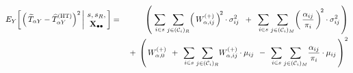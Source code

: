 \begin{lemma}
\begin{enumerate}
\begin{eqnarray*}
    E_{Y}\!\left[
        \left.
        \left(\,\widetilde{T}_{\alpha Y} - \widehat{T}^{\textnormal{(HT)}}_{\alpha Y}\right)^{2}
        \,\right\vert\!\!
        \begin{array}{c} s,s_{R}, \\ \Xobs \end{array}
        \!\!\right]
    & = &
        \left(\;
            \underset{i \in s}{\sum}\,
            \underset{j \in (\mathcal{C}_{i})_{R}}{\sum}\!
            \left(\,W^{(+)}_{\alpha,ij}\,\right)^{\!2}
            \cdot
            \sigma^{2}_{ij}
            \;\; + \;\;
            \underset{i \in s}{\sum}\,
            \underset{j \in (\mathcal{C}_{i})_{M}}{\sum}\!
            \left(\,
                \dfrac{ \alpha_{ij} }{ \pi_{i} }
                \,\right)^{\!2}
            \cdot
            \sigma^{2}_{ij}
            \,\right)
    \\
    &&
        \; + \;
        \left(\,
            W^{(+)}_{\alpha,0}
            \;\, + \;\,
            \underset{i \in s}{\sum}\,
            \underset{j \in (\mathcal{C}_{i})_{R}}{\sum}
            W^{(+)}_{\alpha,ij}\cdot\mu_{ij}
            \;\,-\;\,
            \underset{i \in s}{\sum}\,
            \underset{j \in (\mathcal{C}_{i})_{M}}{\sum}
            \dfrac{ \alpha_{ij} }{ \pi_{i} }\cdot\mu_{ij}
            \,\right)^{2}
    \end{eqnarray*}
\end{enumerate}
\end{lemma}
\proof
\renewcommand{\theenumi}{\roman{enumi}}
\renewcommand{\labelenumi}{\mbox{}\;\;\,(\theenumi)$\quad$}
